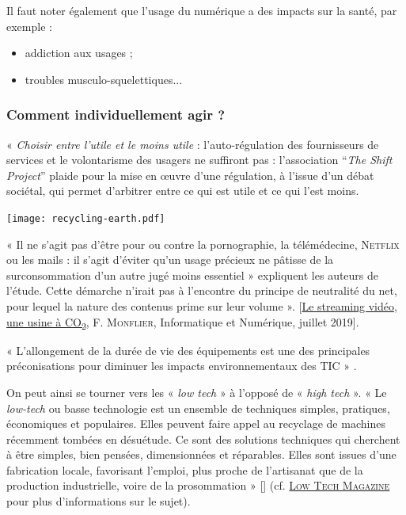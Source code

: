 
Il faut noter également que l'usage du numérique a des impacts sur la santé, par exemple :
\begin{itemize}
\item addiction aux usages ;
\item troubles musculo-squelettiques...
\end{itemize}


\subsubsection[Comment agir ?]{Comment individuellement agir ?}
\label{subsub:IX.4.2.5}

« \emph{Choisir entre l’utile et le moins utile} : l’auto-régulation des fournisseurs de services et le volontarisme des usagers ne suffiront pas : l’association “\textit{The Shift Project}” plaide pour la mise en œuvre d’une régulation, à l’issue d’un débat sociétal, qui permet d’arbitrer entre ce qui est utile et ce qui l’est moins. 
\begin{margingraphic}
\texttt{[image: recycling-earth.pdf]}
\end{margingraphic}
« Il ne s’agit pas d’être pour ou contre la pornographie, la télémédecine, \textsc{Netflix} ou les mails : il s’agit d’éviter qu’un usage précieux ne pâtisse de la surconsommation d’un autre jugé moins essentiel » expliquent les auteurs de l’étude. Cette démarche n’irait pas à l’encontre du principe de neutralité du net, pour lequel la nature des contenus prime sur leur volume ». [\href{https://www.techniques-ingenieur.fr/actualite/articles/le-streaming-video-une-usine-a-co2-68488/}{Le streaming vidéo, une usine à CO\textsubscript{2}}, F. \textsc{Monflier}, Informatique et Numérique, juillet 2019].


« L’allongement de la durée de vie des équipements est une des principales préconisations pour diminuer les impacts environnementaux des TIC » \parencite{Marquet-et-al:2019}.

On peut ainsi se tourner vers les « \textit{low tech} » à l'opposé de « \textit{high tech} ». « Le \textit{low-tech} ou basse technologie est un ensemble de techniques simples, pratiques, économiques et populaires. Elles peuvent faire appel au recyclage de machines récemment tombées en désuétude. Ce sont des solutions techniques qui cherchent à être simples, bien pensées, dimensionnées et réparables. Elles sont issues d'une fabrication locale, favorisant l'emploi, plus proche de l'artisanat que de la production industrielle, voire de la prosommation » [\href{https://fr.wikipedia.org/wiki/Low-tech}{\faWikipediaW}] (cf. \href{https://www.lowtechmagazine.com/}{\textsc{Low Tech Magazine}} pour plus d'informations sur le sujet).

